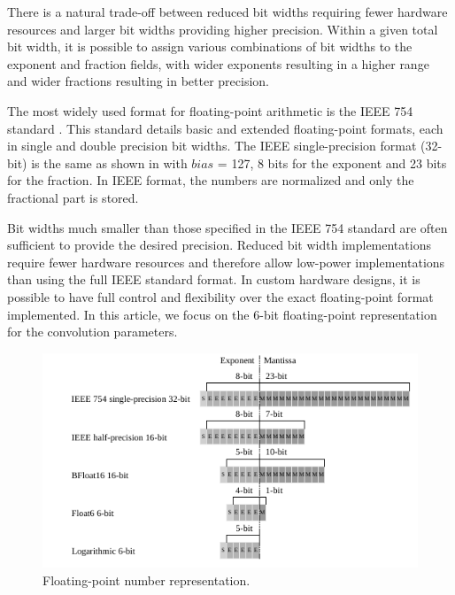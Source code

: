 There is a natural trade-off between reduced bit widths requiring fewer hardware resources and larger bit widths providing higher precision. Within a given total bit width, it is possible to assign various combinations of bit widths to the exponent and fraction fields, with wider exponents resulting in a higher range and wider fractions resulting in better precision.

The most widely used format for floating-point arithmetic is the IEEE 754 standard \cite{ieee1985ieee}. This standard details basic and extended floating-point formats, each in single and double precision bit widths. The IEEE single-precision format (32-bit) is the same as shown in  with $bias$ = 127, 8 bits for the exponent and 23 bits for the fraction. In IEEE format, the numbers are normalized and only the fractional part is stored.

Bit widths much smaller than those specified in the IEEE 754 standard are often sufficient to provide the desired precision. Reduced bit width implementations require fewer hardware resources and therefore allow low-power implementations than using the full IEEE standard format. In custom hardware designs, it is possible to have full control and flexibility over the exact floating-point format implemented. In this article, we focus on the 6-bit floating-point representation for the convolution parameters.

\begin{figure}[h!]
	\centering
	\includegraphics[width=1\columnwidth]{../figures/power_breakdown/floating_point.pdf}
	\caption{Floating-point number representation.}
	\label{fig:floating}
\end{figure}